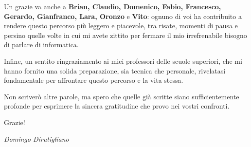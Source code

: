 \vspace{1em}
Un grazie va anche a \textbf{Brian, Claudio, Domenico, Fabio, Francesco, Gerardo, Gianfranco, Lara, Oronzo} e \textbf{Vito}: ognuno di voi ha contribuito a rendere questo percorso più leggero e piacevole, tra risate, momenti di pausa e persino quelle volte in cui mi avete zittito per fermare il mio irrefrenabile bisogno di parlare di informatica.

\vspace{1em}
Infine, un sentito ringraziamento ai miei professori delle scuole superiori, che mi hanno fornito una solida preparazione, sia tecnica che personale, rivelatasi fondamentale per affrontare questo percorso e la vita stessa.

\vspace{1em}
Non scriverò altre parole, ma spero che quelle già scritte siano sufficientemente profonde per esprimere la sincera gratitudine che provo nei vostri confronti.

Grazie!\\
\begin{flushright}
    \textit{Domingo Dirutigliano}
\end{flushright}
